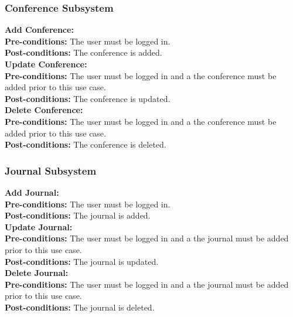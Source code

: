 \documentclass{article}
\begin{document}
		\subsubsection{Conference Subsystem}
			\textbf{Add Conference:}\\
			\indent \textbf{Pre-conditions:} The user must be logged in.\\
			\indent \textbf{Post-conditions:} The conference is added.\\
			\textbf{Update Conference:}\\
			\indent \textbf{Pre-conditions:} The user must be logged in and a the conference must be added prior to this use case.\\
			\indent \textbf{Post-conditions:} The conference is updated.\\
			\textbf{Delete Conference:}\\
			\indent \textbf{Pre-conditions:} The user must be logged in and a the conference must be added prior to this use case.\\
			\indent \textbf{Post-conditions:} The conference is deleted.\\
		\subsubsection{Journal Subsystem}
			\textbf{Add Journal:}\\
			\indent \textbf{Pre-conditions:} The user must be logged in.\\
			\indent \textbf{Post-conditions:} The journal is added.\\
			\textbf{Update Journal:}\\
			\indent \textbf{Pre-conditions:} The user must be logged in and a the journal must be added prior to this use case.\\
			\indent \textbf{Post-conditions:} The journal is updated.\\
			\textbf{Delete Journal:}\\
			\indent \textbf{Pre-conditions:} The user must be logged in and a the journal must be added prior to this use case.\\
			\indent \textbf{Post-conditions:} The journal is deleted.\\
\end{document}
